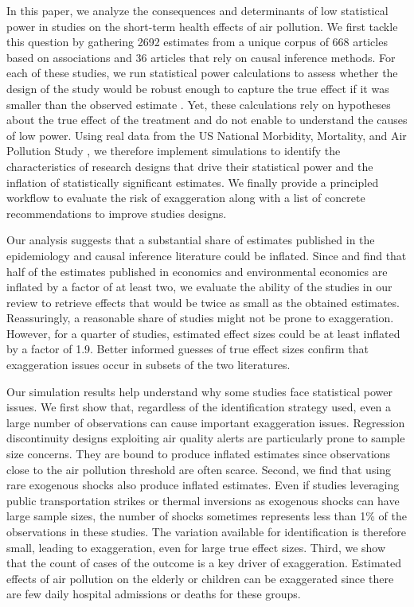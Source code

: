\documentclass[12pt]{article}
\begin{document}
    In this paper, we analyze the consequences and determinants of low statistical power in studies on the short-term health effects of air pollution. We first tackle this question by gathering 2692 estimates from a unique corpus of 668 articles based on associations and 36 articles that rely on causal inference methods. For each of these studies, we run statistical power calculations to assess whether the design of the study would be robust enough to capture the true effect if it was smaller than the observed estimate \citep{gelman_beyond_2014, ioannidis_power_2017, lu_note_2019, timm_retrodesign_2019}. Yet, these calculations rely on hypotheses about the true effect of the treatment and do not enable to understand the causes of low power. Using real data from the US National Morbidity, Mortality, and Air Pollution Study \citep{samet2000national}, we therefore implement simulations to identify the characteristics of research designs that drive their statistical power and the inflation of statistically significant estimates. We finally provide a principled workflow to evaluate the risk of exaggeration along with a list of concrete recommendations to improve studies designs.
    
    Our analysis suggests that a substantial share of estimates published in the epidemiology and causal inference literature could be inflated. Since \cite{ioannidis_power_2017} and \cite{ferraro_featureis_2020} find that half of the estimates published in economics and environmental economics are inflated by a factor of at least two, we evaluate the ability of the studies in our review to retrieve effects that would be twice as small as the obtained estimates. Reassuringly, a reasonable share of studies might not be prone to exaggeration. However, for a quarter of studies, estimated effect sizes could be at least inflated by a factor of 1.9. Better informed guesses of true effect sizes confirm that exaggeration issues occur in subsets of the two literatures.

    Our simulation results help understand why some studies face statistical power issues. We first show that, regardless of the identification strategy used, even a large number of observations can cause important exaggeration issues. Regression discontinuity designs exploiting air quality alerts are particularly prone to sample size concerns. They are bound to produce inflated estimates since observations close to the air pollution threshold are often scarce. Second, we find that using rare exogenous shocks also produce inflated estimates. Even if studies leveraging public transportation strikes or thermal inversions as exogenous shocks can have large sample sizes, the number of shocks sometimes represents less than 1\% of the observations in these studies. The variation available for identification is therefore small, leading to exaggeration, even for large true effect sizes. Third, we show that the count of cases of the outcome is a key driver of exaggeration. Estimated effects of air pollution on the elderly or children can be exaggerated since there are few daily hospital admissions or deaths for these groups. 
    
\end{document}
